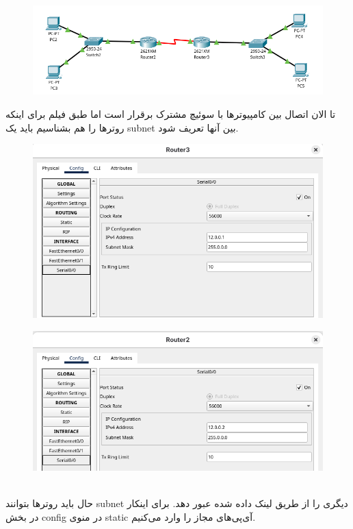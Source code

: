 \begin{figure}[h]
    \centering
    \includegraphics[width=1\textwidth]{img/21.png}
\end{figure}

\clearpage
تا الان اتصال بین کامپیوترها با سوئیچ مشترک برقرار است اما طبق فیلم برای اینکه روترها را هم بشناسیم باید یک subnet بین آنها تعریف شود. 
\begin{figure}[h]
    \centering
    \includegraphics[width=1\textwidth]{img/22.png}
\end{figure}
\begin{figure}[h]
    \centering
    \includegraphics[width=1\textwidth]{img/23.png}
\end{figure}
\\
حال باید روترها بتوانند subnet دیگری را از طریق لینک داده شده عبور دهد. برای اینکار در بخش config در منوی static آی‌پی‌های مجاز را وارد می‌کنیم.
